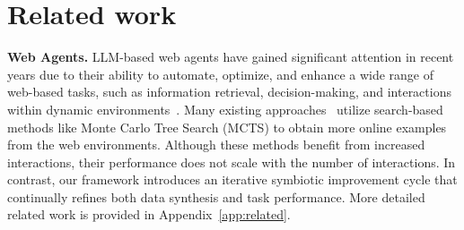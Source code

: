 \section{Related work}

    \textbf{Web Agents.} LLM-based web agents have gained significant attention in recent years due to their ability to automate, optimize, and enhance a wide range of web-based tasks, such as information retrieval, decision-making, and interactions within dynamic environments~\cite{zhou2023webarena,
    deng2023mind2web, yao2023webshop, pan2024webcanvas, levy2024stwebagentbench,
    dechezelles2024browsergym}.  Many existing approaches~\cite{koh2024tree,
    putta2024agentq, yu2025exact}
    utilize search-based methods like Monte Carlo Tree Search (MCTS) to obtain
    more online examples from the web environments. 
    Although these methods benefit from increased interactions, their performance does not scale with the number of interactions. In contrast, our framework introduces an iterative symbiotic improvement cycle that continually refines both data synthesis and task performance. More detailed related work is provided in Appendix~\ref{app:related}.

